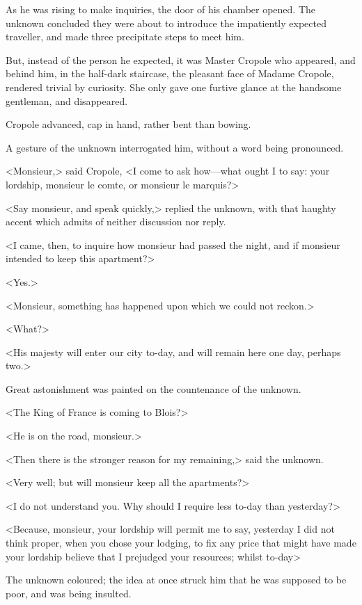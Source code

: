 As he was rising to make inquiries, the door of his chamber opened. The unknown concluded they were about to introduce the impatiently expected traveller, and made three precipitate steps to meet him.

But, instead of the person he expected, it was Master Cropole who appeared, and behind him, in the half-dark staircase, the pleasant face of Madame Cropole, rendered trivial by curiosity. She only gave one furtive glance at the handsome gentleman, and disappeared.

Cropole advanced, cap in hand, rather bent than bowing.

A gesture of the unknown interrogated him, without a word being pronounced.

<Monsieur,> said Cropole, <I come to ask how—what ought I to say: your lordship, monsieur le comte, or monsieur le marquis?>

<Say monsieur, and speak quickly,> replied the unknown, with that haughty accent which admits of neither discussion nor reply.

<I came, then, to inquire how monsieur had passed the night, and if monsieur intended to keep this apartment?>

<Yes.>

<Monsieur, something has happened upon which we could not reckon.>

<What?>

<His majesty  will enter our city to-day, and will remain here one day, perhaps two.>

Great astonishment was painted on the countenance of the unknown.

<The King of France is coming to Blois?>

<He is on the road, monsieur.>

<Then there is the stronger reason for my remaining,> said the unknown.

<Very well; but will monsieur keep all the apartments?>

<I do not understand you. Why should I require less to-day than yesterday?>

<Because, monsieur, your lordship will permit me to say, yesterday I did not think proper, when you chose your lodging, to fix any price that might have made your lordship believe that I prejudged your resources; whilst to-day\longdash>

The unknown coloured; the idea at once struck him that he was supposed to be poor, and was being insulted.


